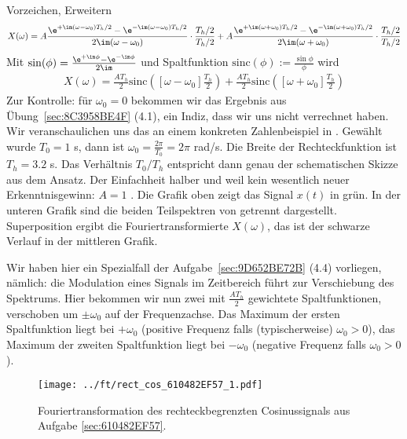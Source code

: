 \begin{ExCalc}
Vorzeichen, Erweitern
%
\begin{align}
X(\omega) =
A\frac{\e^{+\im (\omega-\omega_0) T_h/2} - \e^{-\im (\omega-\omega_0) T_h/2}}{2\im (\omega-\omega_0)} \cdot \frac{T_h/2}{T_h/2}
+A \frac{\e^{+\im (\omega+\omega_0) T_h/2} - \e^{-\im (\omega+\omega_0) T_h/2}}{2\im (\omega+\omega_0)} \cdot \frac{T_h/2}{T_h/2}
\end{align}
%
Mit $\sin(\phi) = \frac{\e^{+\im \phi}-\e^{-\im \phi}}{2\im}$ und Spaltfunktion
$\mathrm{sinc}(\phi):=\frac{\sin \phi}{\phi}$ wird
\begin{align}
\label{eq:610482EF57_Xjw}
X(\omega) =
\frac{A T_h}{2} \mathrm{sinc}\left([\omega-\omega_0] \frac{T_h}{2}\right) +
\frac{A T_h}{2} \mathrm{sinc}\left([\omega+\omega_0] \frac{T_h}{2}\right)
\end{align}
Zur Kontrolle: für $\omega_0 = 0$ bekommen wir das Ergebnis aus Übung~\ref{sec:8C3958BE4F} (4.1),
%
ein Indiz, dass wir uns nicht verrechnet haben.
%
Wir veranschaulichen uns das an einem konkreten Zahlenbeispiel in
. Gewählt wurde $T_0=1$ s, dann ist
$\omega_0 = \frac{2\pi}{T_0}=2\pi$ rad/s. Die Breite der Rechteckfunktion
ist $T_h=3.2$ s. Das Verhältnis $T_0/T_h$ entspricht dann genau der
schematischen Skizze aus dem Ansatz. Der Einfachheit halber und weil
kein wesentlich neuer Erkenntnisgewinn: $A=1$ .
%
Die Grafik oben zeigt das Signal $x(t)$ in grün.
In der unteren Grafik sind die beiden Teilspektren von 
getrennt dargestellt.
Superposition ergibt die Fouriertransformierte $X(\omega)$, das ist der schwarze
Verlauf in der mittleren Grafik.

Wir haben hier ein Spezialfall der Aufgabe~\ref{sec:9D652BE72B} (4.4) vorliegen, nämlich: die Modulation
eines Signals im Zeitbereich führt zur Verschiebung des Spektrums.
Hier bekommen wir nun zwei mit $\frac{A T_h}{2}$ gewichtete Spaltfunktionen,
verschoben um $\pm \omega_0$ auf der Frequenzachse. Das Maximum der ersten Spaltfunktion
liegt bei $+\omega_0$ (positive Frequenz falls (typischerweise) $\omega_0>0$),
das Maximum der zweiten Spaltfunktion liegt bei $-\omega_0$ (negative Frequenz
falls $\omega_0>0$).


\end{ExCalc}
%
\begin{figure}[h]
\centering
  \texttt{[image: ../ft/rect\_cos\_610482EF57\_1.pdf]}
  \caption{Fouriertransformation des rechteckbegrenzten Cosinussignals
  aus Aufgabe \ref{sec:610482EF57}.}
  \label{fig:rect_cos_610482EF57_1}
\end{figure}









